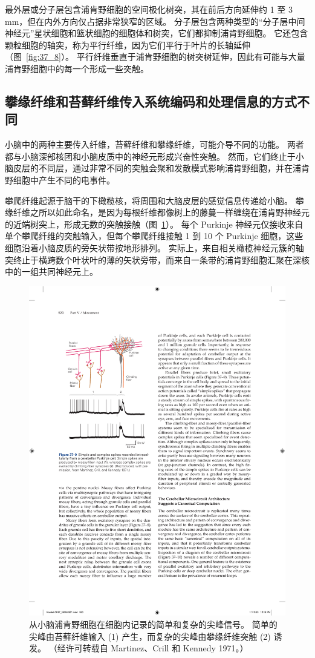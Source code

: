 最外层或分子层包含浦肯野细胞的空间极化树突，其在前后方向延伸约 1 至 3 mm，但在内外方向仅占据非常狭窄的区域。
分子层包含两种类型的“分子层中间神经元”星状细胞和篮状细胞的细胞体和树突，它们都抑制浦肯野细胞。
它还包含颗粒细胞的轴突，称为平行纤维，因为它们平行于叶片的长轴延伸（图~\ref{fig:37_8}）。
平行纤维垂直于浦肯野细胞的树突树延伸，因此有可能与大量浦肯野细胞中的每一个形成一些突触。



\subsection{攀缘纤维和苔藓纤维传入系统编码和处理信息的方式不同}

小脑中的两种主要传入纤维，苔藓纤维和攀缘纤维，可能介导不同的功能。
两者都与小脑深部核团和小脑皮质中的神经元形成兴奋性突触。
然而，它们终止于小脑皮层的不同层，通过非常不同的突触会聚和发散模式影响浦肯野细胞，并在浦肯野细胞中产生不同的电事件。


攀爬纤维起源于脑干的下橄榄核，将周围和大脑皮层的感觉信息传递给小脑。
攀缘纤维之所以如此命名，是因为每根纤维都像树上的藤蔓一样缠绕在浦肯野神经元的近端树突上，形成无数的突触接触（图~\ref{fig:37_9}）。
每个 Purkinje 神经元仅接收来自单个攀爬纤维的突触输入，但每个攀爬纤维接触 1 到 10 个 Purkinje 细胞，这些细胞沿着小脑皮质的旁矢状带按地形排列。
实际上，来自相关橄榄神经元簇的轴突终止于横跨数个叶状叶的薄的矢状旁带，而来自一条带的浦肯野细胞汇聚在深核中的一组共同神经元上。


\begin{figure}[htbp]
	\centering
	\includegraphics[width=0.45\linewidth]{chap37/fig_37_9}
	\caption{从小脑浦肯野细胞在细胞内记录的简单和复杂的尖峰信号。 简单的尖峰由苔藓纤维输入 (1) 产生，而复杂的尖峰由攀缘纤维突触 (2) 诱发。 （经许可转载自 Martinez、Crill 和 Kennedy 1971。）}
	\label{fig:37_9}
\end{figure}


